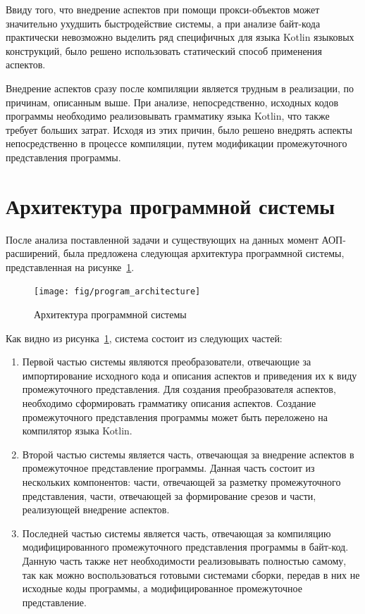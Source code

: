 Ввиду того, что внедрение аспектов при помощи прокси-объектов может значительно
ухудшить быстродействие системы, а при анализе байт-кода практически невозможно выделить ряд специфичных для языка Kotlin языковых конструкций, было решено использовать статический способ применения аспектов.

Внедрение аспектов сразу после компиляции является трудным в реализации, по
причинам, описанным выше.
При анализе, непосредственно, исходных кодов программы необходимо реализовывать
грамматику языка Kotlin, что также требует больших затрат.
Исходя из этих причин, было решено внедрять аспекты непосредственно в процессе
компиляции, путем модификации промежуточного представления программы.
\section{Архитектура программной системы}
\label{sec:prototype_structure}
После анализа поставленной задачи и существующих на данных момент
АОП-расширений, была предложена следующая архитектура программной системы,
представленная на рисунке~\ref{fig:program_architecture}.

\begin{figure}[htbp]
\centering
\texttt{[image: fig/program\_architecture]}
\caption{Архитектура программной системы}%
\label{fig:program_architecture}
\end{figure}

Как видно из рисунка~\ref{fig:program_architecture}, система состоит из
следующих частей:
\begin{enumerate}
	\item Первой частью системы являются преобразователи, отвечающие за
		 импортирование исходного кода и описания аспектов и приведения их к
		 виду промежуточного представления.
		 Для создания преобразователя аспектов, необходимо сформировать
		 грамматику описания аспектов.
		 Создание промежуточного представления программы может быть переложено
		 на компилятор языка Kotlin.
	\item Второй частью системы является часть, отвечающая за внедрение аспектов
		в промежуточное представление программы.
		Данная часть состоит из нескольких компонентов: части, отвечающей за
		разметку промежуточного представления, части, отвечающей за формирование
		срезов и части, реализующей внедрение аспектов.
	\item Последней частью системы является часть, отвечающая за компиляцию
		модифицированного промежуточного представления программы в байт-код.
		Данную часть также нет необходимости реализовывать полностью самому, так
		как можно воспользоваться готовыми системами сборки, передав в них
		не исходные коды программы, а модифицированное промежуточное
		представление.
\end{enumerate}

